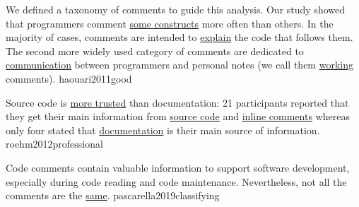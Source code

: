 \documentclass{article}
\begin{document}
  {We defined a taxonomy of comments to guide this analysis. Our study showed that programmers comment \ul{some constructs} more often than others. In the majority of cases, comments are intended to \ul{explain} the code that follows them. The second more widely used category of comments are dedicated to \ul{communication} between programmers and personal notes (we call them \ul{working} comments).}
  {haouari2011good}



  {Source code is \ul{more trusted} than documentation: 21 participants reported that they get their main information from \ul{source code} and \ul{inline comments} whereas only four stated that \ul{documentation} is their main source of information.}
  {roehm2012professional}

  {Code comments contain valuable information to support software development, especially during code reading and code maintenance. Nevertheless, not all the comments are the \ul{same}.}
  {pascarella2019classifying}

\end{document}
